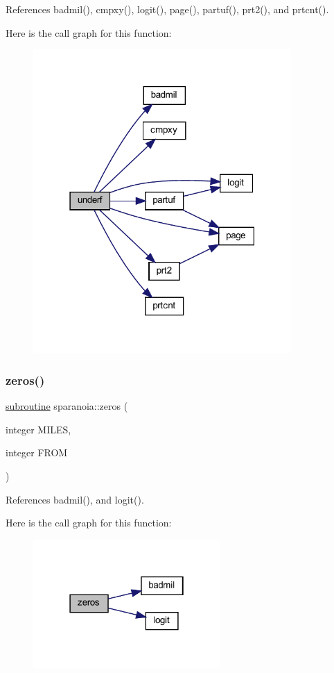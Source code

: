 References badmil(), cmpxy(), logit(), page(), partuf(), prt2(), and prtcnt().

Here is the call graph for this function\+:
\nopagebreak
\begin{figure}[H]
\begin{center}
\leavevmode
\includegraphics[width=279pt]{sparanoia_8f90_a147b84087576e0dcdf30b8e154e1422b_cgraph}
\end{center}
\end{figure}
\mbox{\label{sparanoia_8f90_afbd0ce3d8d240b13d4a3746cc40f2619}} 
\subsubsection{\texorpdfstring{zeros()}{zeros()}}
{\footnotesize\ttfamily \hyperlink{M__stopwatch_83_8txt_acfbcff50169d691ff02d4a123ed70482}{subroutine} sparanoia\+::zeros (\begin{DoxyParamCaption}\item[{integer}]{M\+I\+L\+ES,  }\item[{integer}]{F\+R\+OM }\end{DoxyParamCaption})}



References badmil(), and logit().

Here is the call graph for this function\+:
\nopagebreak
\begin{figure}[H]
\begin{center}
\leavevmode
\includegraphics[width=202pt]{sparanoia_8f90_afbd0ce3d8d240b13d4a3746cc40f2619_cgraph}
\end{center}
\end{figure}
